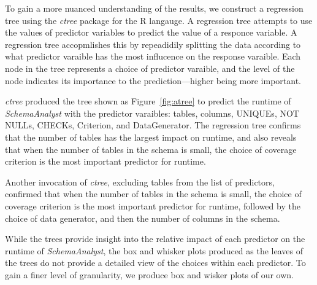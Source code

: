 To gain a more nuanced understanding of the results, we construct a
regression tree using the \textit{ctree} package for the R langauge. A
regression tree attempts to use the values of predictor variables to
predict the value of a responce variable. A regression tree accopmlishes
this by repeadidily splitting the data according to what predictor varaible has the
most influcence on the response varaible. Each node in the tree represents a choice
of predictor varaible, and the level of the node indicates its
importance to the prediction---higher being more important.

\textit{ctree} produced the tree shown as Figure~\ref{fig:atree} to
predict the runtime of \textit{SchemaAnalyst} with the predictor varaibles:
tables, columns, UNIQUEs, NOT NULLs, CHECKs, Criterion, and
DataGenerator. The regression tree confirms that the number of
tables has the largest impact on runtime, and also reveals that when the number of tables in the schema is small, 
the choice of coverage criterion is the most important predictor for runtime.

Another invocation of \textit{ctree}, excluding tables from the list of
predictors, confirmed that when the number of tables in the schema is small, the choice of coverage criterion is the
most important predictor for runtime, followed by the choice of data
generator, and then the number of columns in the schema.

While the trees provide insight into the relative impact of each
predictor on the runtime of \textit{SchemaAnalyst}, the box and whisker
plots produced as the leaves of the trees do not provide a detailed view
of the choices within each predictor.  To gain a finer level of
granularity, we produce box and wisker plots of our own.
